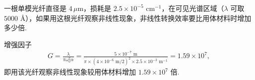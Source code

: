 \documentclass{assignment}
\begin{document}
\begin{prob}
    一根单模光纤直径是 $4\,\mu$m，损耗是 $2.5\times 10^{-5}$ cm$^{-1}$，在可见光谱区域（$\lambda$ 可取 $5000$ \AA），如果用这根光纤观察非线性现象，非线性转换效率要比用体材料时增加多少倍.
\end{prob}
\begin{sol}
    增强因子
    \begin{align}
        G=\frac{\lambda}{\pi\omega_0^2\alpha}=\frac{5\times 10^{-7}\text{ m}}{\pi\times(4\times 10^{-6}\text{ m}/2)^2\times 2.5\times 10^{-3}\text{ m}^{-1}}=1.59\times 10^7,
    \end{align}
    即用该光纤观察非线性现象较用体材料增加 $1.59\times 10^7$ 倍.
\end{sol}
\end{document}
